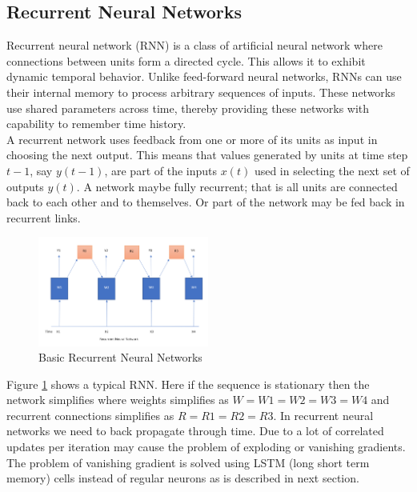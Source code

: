 \documentclass[conference]{IEEEtran}
\begin{document}
\subsection{Recurrent Neural Networks}
Recurrent neural network (RNN) is a class of artificial neural network where connections between units form a directed cycle. This allows it to exhibit dynamic temporal behavior. Unlike feed-forward neural networks, RNNs can use their internal memory to process arbitrary sequences of inputs. These networks use shared parameters across time, thereby providing these networks with capability to remember time history.\\

A recurrent network uses feedback from one or more of its units as input in choosing the next output. This means that values generated by units at time step $t-1$, say $y(t-1)$, are part of the inputs $x(t)$ used in selecting the next set of outputs $y(t)$. A network maybe fully recurrent; that is all units are connected back to each other and to themselves. Or part of the network may be fed back in recurrent links. \cite{judy1}\\

\begin{figure}[h]
\includegraphics[width=0.5\textwidth]{1.PNG}
\caption{Basic Recurrent Neural Networks}
\label{fig:figure7}
\end{figure}

Figure \ref{fig:figure7} shows a typical RNN. Here if the sequence is stationary then the network simplifies where weights simplifies as $W = W1 = W2 = W3 = W4$ and recurrent connections simplifies as $R = R1 = R2 = R3$.
In recurrent neural networks we need to back propagate through time. Due to a lot of correlated updates per iteration may cause the problem of exploding or vanishing gradients. The problem of vanishing gradient is solved using LSTM (long short term memory) cells instead of regular neurons as is described in next section.
\end{document}
